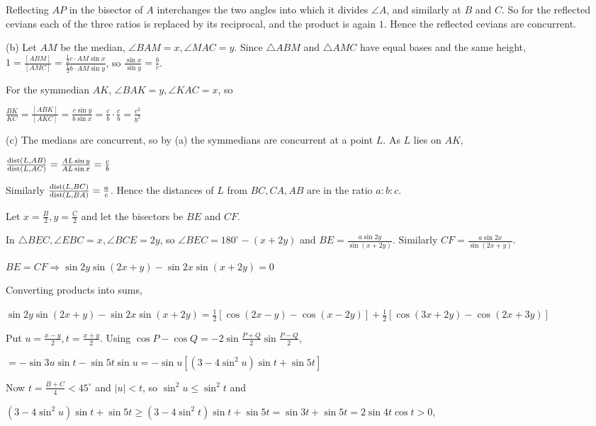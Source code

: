   Reflecting $AP$ in the bisector of $A$ interchanges the two angles into which it divides $\angle A$, and
  similarly at $B$ and $C$. So for the reflected cevians each of the three ratios is replaced by its
  reciprocal, and the product is again $1$. Hence the reflected cevians are concurrent.

  (b) Let $AM$ be the median, $\angle BAM = x, \angle MAC = y$. Since $\triangle ABM$ and $\triangle AMC$ have
  equal bases and the same height, $1 = \frac{[ABM]}{[AMC]} = \frac{\frac{1}{2}c\cdot AM\sin
  x}{\frac{1}{2}b\cdot AM\sin y}$, so $\frac{\sin x}{\sin y} = \frac{b}{c}$.

  For the symmedian $AK$, $\angle BAK = y, \angle KAC = x$, so

  $\frac{BK}{KC} = \frac{[ABK]}{[AKC]} = \frac{c\sin y}{b\sin x} = \frac{c}{b}\cdot\frac{c}{b} =
  \frac{c^2}{b^2}$

  (c) The medians are concurrent, so by (a) the symmedians are concurrent at a point $L$. As $L$ lies on $AK$,

  $\frac{{\rm dist}(L, AB)}{{\rm dist}(L, AC)} = \frac{AL\sin y}{AL\sin x} = \frac{c}{b}$

  Similarly $\frac{{\rm dist}(L, BC)}{{\rm dist}(L, BA)} = \frac{a}{c}$. Hence the distances of $L$ from $BC,
  CA, AB$ are in the ratio $a:b:c$.
\item Let $x = \frac{B}{2}, y = \frac{C}{2}$ and let the bisectors be $BE$ and $CF$.

  In $\triangle BEC, \angle EBC = x, \angle BCE = 2y$, so $\angle BEC = 180^\circ - (x + 2y)$ and $BE =
  \frac{a\sin2y}{\sin(x + 2y)}$. Similarly $CF = \frac{a\sin2x}{\sin(2x + y)}$.

  $BE = CF\Rightarrow \sin2y\sin(2x + y) - \sin2x\sin(x + 2y) = 0$

  Converting products into sums,

  $\sin2y\sin(2x + y) - \sin2x\sin(x + 2y) = \frac{1}{2}[\cos(2x - y) - \cos(x - 2y)] + \frac{1}{2}[\cos(3x +
  2y) - \cos(2x + 3y)]$

  Put $u = \frac{x - y}{2}, t = \frac{x + y}{2}$. Using $\cos P - \cos Q = -2\sin\frac{P + Q}{2}\sin\frac{P -
  Q}{2}$,

  $= -\sin3u\sin t - \sin5t\sin u = -\sin u\left[(3 - 4\sin^2u)\sin t + \sin5t\right]$

  Now $t = \frac{B + C}{4} < 45^\circ$ and $|u| < t$, so $\sin^2u\leq\sin^2t$ and

  $(3 - 4\sin^2u)\sin t + \sin5t\geq(3 - 4\sin^2t)\sin t + \sin5t = \sin3t + \sin5t = 2\sin4t\cos t > 0$,

